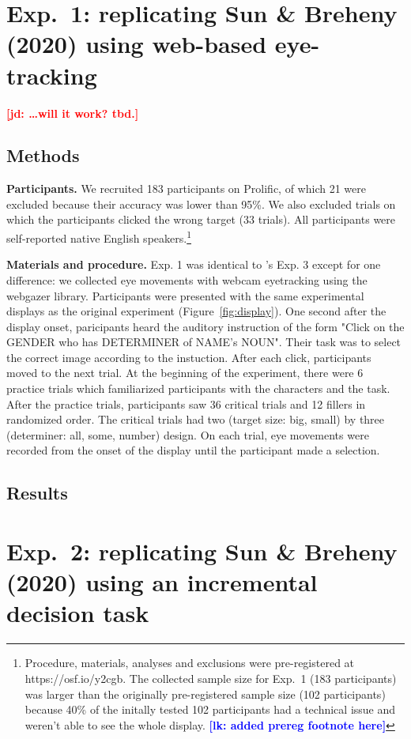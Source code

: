 \documentclass[10pt,letterpaper]{article}
\newcommand{\figref}[1]{Figure~\ref{#1}}
\newcommand{\jd}[1]{\textcolor{Red}{\textbf{[jd: #1]}}}
\newcommand{\lk}[1]{\textcolor{Blue}{\textbf{[lk: #1]}}}
\begin{document}
\section{Exp.~1: replicating Sun \& Breheny (2020) using web-based eye-tracking}

\jd{\dots will it work? tbd.}

\subsection{Methods}

\textbf{Participants.} We recruited 183 participants on Prolific, of which 21 were excluded because their accuracy was lower than 95\%. We also excluded trials on which the participants clicked the wrong target (33 trials). All participants were self-reported native English speakers.\footnote{Procedure, materials, analyses and exclusions were pre-registered at https://osf.io/y2cgb. The collected sample size for Exp.~1 (183 participants) was larger than the originally pre-registered sample size (102 participants) because 40\% of the initally tested 102 participants had a technical issue and weren't able to see the whole display. \lk{added prereg footnote here}}

\textbf{Materials and procedure.} Exp. 1 was identical to 's Exp. 3 except for one difference: we collected eye movements with webcam eyetracking using the webgazer library. Participants were presented with the same experimental displays as the original experiment (\figref{fig:display}). One second after the display onset, paricipants heard the auditory instruction of the form "Click on the GENDER who has DETERMINER of NAME's NOUN". Their task was to select the correct image according to the instuction. After each click, participants moved to the next trial. At the beginning of the experiment, there were 6 practice trials which familiarized participants with the characters and the task. After the practice trials, participants saw 36 critical trials and 12 fillers in randomized order. The critical trials had two (target size: big, small) by three (determiner: all, some, number) design. On each trial, eye movements were recorded from the onset of the display until the participant made a selection.

\subsection{Results}

\section{Exp.~2: replicating Sun \& Breheny (2020) using an incremental decision task}
\end{document}

